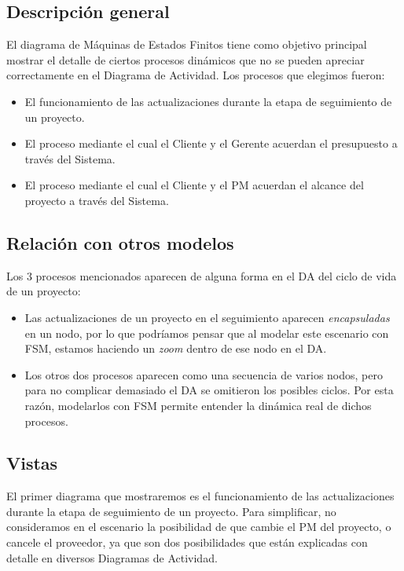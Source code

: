 \subsection{Descripción general}
El diagrama de Máquinas de Estados Finitos tiene como objetivo principal mostrar el detalle de ciertos procesos dinámicos que no se pueden apreciar correctamente en el Diagrama de Actividad. Los procesos que elegimos fueron:

\begin{itemize}
    \item El funcionamiento de las actualizaciones durante la etapa de seguimiento de un proyecto.
    \item El proceso mediante el cual el Cliente y el Gerente acuerdan el presupuesto a través del Sistema.
    \item El proceso mediante el cual el Cliente y el PM acuerdan el alcance del proyecto a través del Sistema.
\end{itemize}

\subsection{Relación con otros modelos}
Los 3 procesos mencionados aparecen de alguna forma en el DA del ciclo de vida de un proyecto:

\begin{itemize}
    \item Las actualizaciones de un proyecto en el seguimiento aparecen \textit{encapsuladas} en un nodo, por lo que podríamos pensar que al modelar este escenario con FSM, estamos haciendo un \textit{zoom} dentro de ese nodo en el DA.
    \item Los otros dos procesos aparecen como una secuencia de varios nodos, pero para no complicar demasiado el DA se omitieron los posibles ciclos. Por esta razón, modelarlos con FSM permite entender la dinámica real de dichos procesos.
\end{itemize}


\newpage
\subsection{Vistas}

El primer diagrama que mostraremos es el funcionamiento de las actualizaciones durante la etapa de seguimiento de un proyecto. Para simplificar, no consideramos en el escenario la posibilidad de que cambie el PM del proyecto, o cancele el proveedor, ya que son dos posibilidades que están explicadas con detalle en diversos Diagramas de Actividad.

